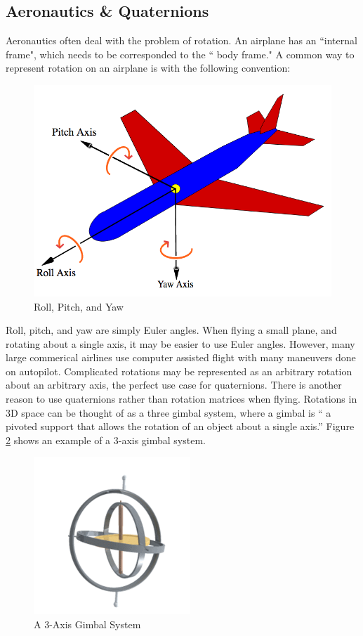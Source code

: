 \subsection{Aeronautics \& Quaternions}
Aeronautics often deal with the problem of rotation.
An airplane has an ``internal frame", which needs to be corresponded to the `` body frame."
A common way to represent rotation on an airplane is with the following convention:
\begin{figure}[H]
\centering
\includegraphics[width = .75\textwidth]{Figures/plane.png}
\caption{Roll, Pitch, and Yaw}
\label{fig:cycle}
\end{figure}
Roll, pitch, and yaw are simply Euler angles.
When flying a small plane, and rotating about a single axis, it may be easier to use Euler angles.
However, many large commerical airlines use computer assisted flight with many maneuvers done on autopilot.
Complicated rotations may be represented as an arbitrary rotation about an arbitrary axis, the perfect use case for quaternions.
There is another reason to use quaternions rather than rotation matrices when flying.
Rotations in 3D space can be thought of as a three gimbal system, where a gimbal is `` a pivoted support that allows the rotation of an object about a single axis.''
Figure \ref{fig:gimbal} shows an example of a 3-axis gimbal system.
\begin{figure}[H]
\centering
\includegraphics[width = .75\textwidth]{Figures/gimbal.png}
\caption{A 3-Axis Gimbal System}
\label{fig:gimbal}
\end{figure}

